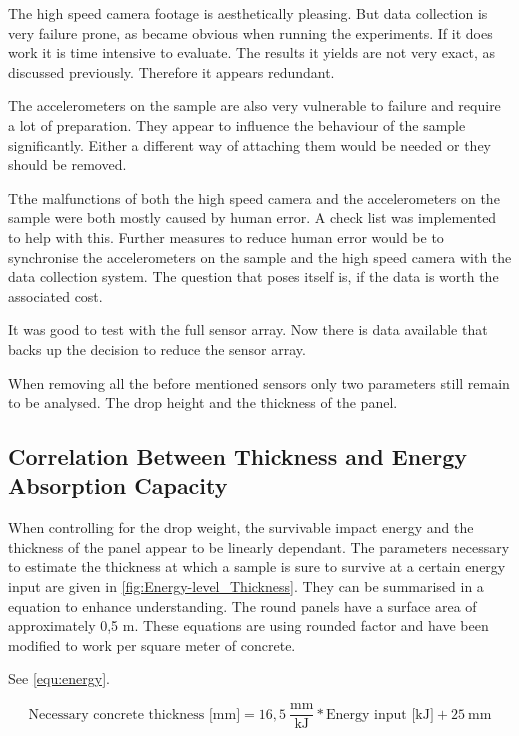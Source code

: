 The high speed camera footage is aesthetically pleasing. But data collection is very failure prone, as became obvious when running the experiments. If it does work it is time intensive to evaluate. The results it yields are not very exact, as discussed previously. Therefore it appears redundant.

The accelerometers on the sample are also very vulnerable to failure and require a lot of preparation. They appear to influence the behaviour of the sample significantly. Either a different way of attaching them would be needed or they should be removed.

Tthe malfunctions of both the high speed camera and the accelerometers on the sample were both mostly caused by human error. A check list was implemented to help with this. Further measures to reduce human error would be to synchronise the accelerometers on the sample and the high speed camera with the data collection system. The question that poses itself is, if the data is worth the associated cost.

It was good to test with the full sensor array. Now there is data available that backs up the decision to reduce the sensor array.

When removing all the before mentioned sensors only two parameters still remain to be analysed. The drop height and the thickness of the panel.

\subsection{Correlation Between Thickness and Energy Absorption Capacity}
\label{ssec:energy}

When controlling for the drop weight, the survivable impact energy and the thickness of the panel appear to be linearly dependant. The parameters necessary to estimate the thickness at which a sample is sure to survive at a certain energy input are given in \autoref{fig:Energy-level_Thickness}. They can be summarised in a equation to enhance understanding. The round panels have a surface area of approximately 0,5 m. These equations are using rounded factor and have been modified to work per square meter of concrete.

See \autoref{equ:energy}.


\begin{equation}\label{equ:energy}
    \text{Necessary concrete thickness [mm]} = 16,5 ~\frac{\text{mm}}{\text{kJ}} * \text{Energy input [kJ]} + 25 ~\text{mm}
\end{equation}

